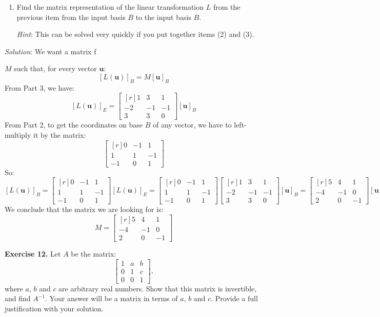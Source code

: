\documentclass[12pt]{article}
\begin{document}
\begin{enumerate}
\item Find the matrix representation of the linear transformation $L$ from the previous item from the input basis $B$ to the input basis $B$.

\emph{Hint}: This can be solved very quickly if you put together items (2) and (3).
\end{enumerate}

\emph{Solution}: We want a matrix f{$M$ such that, for every vector $\mathbf{u}$:
\[
[L(\mathbf{u})]_B=M[\mathbf{u}]_B
\]
From Part 3, we have:
\[
[L(\mathbf{u})]_E=\begin{bmatrix*}[r]1&3&1\\-2&-1&-1\\3&3&0\end{bmatrix*}[\mathbf{u}]_B
\]
From Part 2, to get the coordinates on base $B$ of any vector, we have to left-multiply it by the matrix:
\[
\left[\begin{matrix*}[r] 0 & -1 & 1\\ 1 & 1 & -1\\ -1 & 0 & 1\end{matrix*}\right]
\]
So:
\[
[L(\mathbf{u})]_B = \left[\begin{matrix*}[r] 0 & -1 & 1\\ 1 & 1 & -1\\ -1 & 0 & 1\end{matrix*}\right]
[L(\mathbf{u})]_E=\left[\begin{matrix*}[r] 0 & -1 & 1\\ 1 & 1 & -1\\ -1 & 0 & 1\end{matrix*}\right]
\begin{bmatrix*}[r]1&3&1\\-2&-1&-1\\3&3&0\end{bmatrix*}[\mathbf{u}]_B=
\left[\begin{matrix*}[r]5 & 4 & 1\\-4 & -1 & 0\\2 & 0 & -1\end{matrix*}\right][\mathbf{u}]_B
\]
We conclude that the matrix we are looking for is:
\[
M = \left[\begin{matrix*}[r]5 & 4 & 1\\-4 & -1 & 0\\2 & 0 & -1\end{matrix*}\right]
\]
\proofend

\textbf{Exercise 12.} Let $A$ be the matrix:
\[
\begin{bmatrix} 1 & a & b \\ 0 & 1 & c \\ 0 & 0 & 1\end{bmatrix},
\] 
where $a$, $b$ and $c$ are arbitrary real numbers. Show that this matrix is invertible, and find $A^{-1}$. Your answer will be a matrix in terms of $a$, $b$ and $c$. Provide a full justification with your solution.

}
\end{document}
